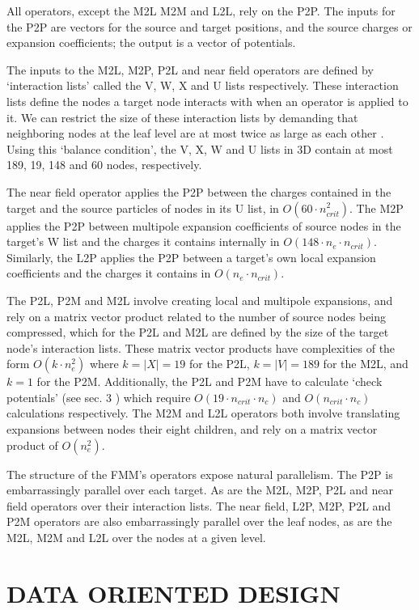 \documentclass{IEEEcsmag}
\begin{document}
All operators, except the M2L M2M and L2L, rely on the P2P. The inputs for the P2P are vectors for the source and target positions, and the source charges or expansion coefficients; the output is a vector of potentials.

The inputs to the M2L, M2P, P2L and near field operators are defined by `interaction lists' called the V, W, X and U lists respectively. These interaction lists define the nodes a target node interacts with when an operator is applied to it. We can restrict the size of these interaction lists by demanding that neighboring nodes at the leaf level are at most twice as large as each other \cite{Sundar2007}. Using this `balance condition', the V, X, W and U lists in 3D contain at most 189, 19, 148 and 60 nodes, respectively.

The near field operator applies the P2P between the charges contained in the target and the source particles of nodes in its U list, in $O(60 \cdot n_{crit}^2)$. The M2P applies the P2P between multipole expansion coefficients of source nodes in the target's W list and the charges it contains internally in $O(148 \cdot n_e \cdot n_{crit})$. Similarly, the L2P applies the P2P between a target's own local expansion coefficients and the charges it contains in $O(n_e \cdot n_{crit})$.

The P2L, P2M and M2L involve creating local and multipole expansions, and rely on a matrix vector product related to the number of source nodes being compressed, which for the P2L and M2L are defined by the size of the target node's interaction lists. These matrix vector products have complexities of the form $O(k \cdot n_e^2)$ where $k = |X| = 19$ for the P2L, $k = |V| = 189$ for the M2L, and $k = 1$ for the P2M. Additionally, the P2L and P2M have to calculate `check potentials' (see sec. 3 \cite{Ying2004}) which require $O(19 \cdot n_{crit} \cdot n_c)$ and $O(n_{crit} \cdot n_c)$ calculations respectively. The M2M and L2L operators both involve translating expansions between nodes their eight children, and rely on a matrix vector product of $O(n_e^2)$.

The structure of the FMM's operators expose natural parallelism. The P2P is embarrassingly parallel over each target. As are the M2L, M2P, P2L and near field operators over their interaction lists. The near field, L2P, M2P, P2L and P2M operators are also embarrassingly parallel over the leaf nodes, as are the M2L, M2M and L2L over the nodes at a given level.

\section{DATA ORIENTED DESIGN}
\end{document}
